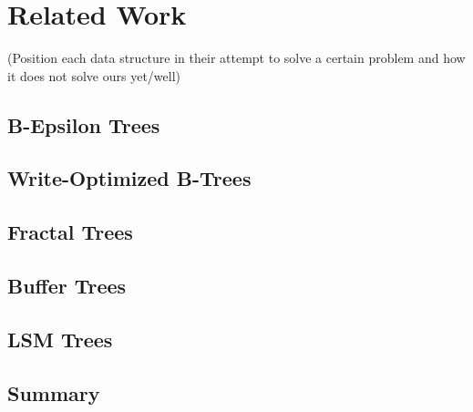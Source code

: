 \chapter{Related Work}
(Position each data structure in their attempt to solve a certain problem and how it does not solve ours yet/well)

\section{B-Epsilon Trees}
\section{Write-Optimized B-Trees}
\section{Fractal Trees}
\section{Buffer Trees}
\section{LSM Trees}
\section{Summary}